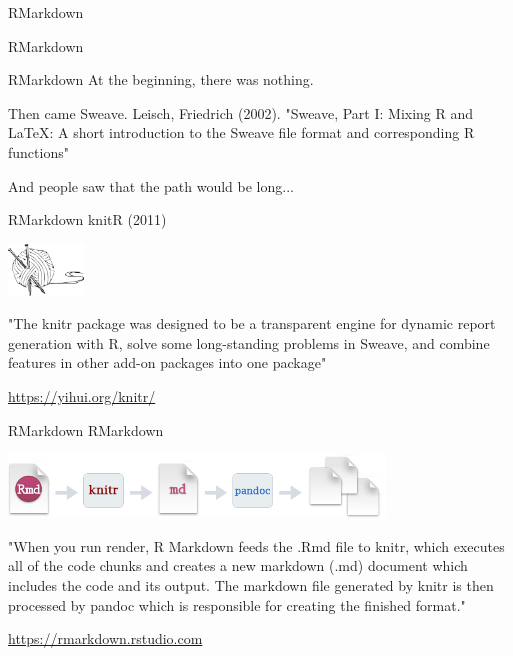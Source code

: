 \begin{frame}{RMarkdown}

\huge{RMarkdown} 

\end{frame}

\begin{frame}{RMarkdown}
At the beginning, there was nothing. \newline \pause

Then came Sweave.\newline
Leisch, Friedrich (2002). "Sweave, Part I: Mixing R and LaTeX: A short introduction to the Sweave file format and corresponding R functions" \pause

And people saw that the path would be long...
\end{frame}

\begin{frame}{RMarkdown}
knitR (2011)

\begin{center}
    \includegraphics[width=2cm]{07_notebook/images/knitr_logo.png}
\end{center}

"The knitr package was designed to be a transparent engine for dynamic report generation with R, solve some long-standing problems in Sweave, and combine features in other add-on packages into one package"

\url{https://yihui.org/knitr/}

\end{frame}

\begin{frame}{RMarkdown}
RMarkdown 

\begin{center}
    \includegraphics[width=10cm]{07_notebook/images/rmarkdown_workflow.png}
\end{center}

"When you run render, R Markdown feeds the .Rmd file to knitr, which executes all of the code chunks and creates a new markdown (.md) document which includes the code and its output. \newline
The markdown file generated by knitr is then processed by pandoc which is responsible for creating the finished format."

\url{https://rmarkdown.rstudio.com}
\end{frame}

